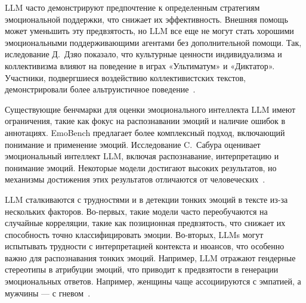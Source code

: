 LLM часто демонстрируют предпочтение к определенным стратегиям эмоциональной поддержки, что снижает их эффективность. Внешняя помощь может уменьшить эту предвзятость, но LLM все еще не могут стать хорошими эмоциональными поддерживающими агентами без дополнительной помощи. Так, иследование Д.~Дзяо показало, что культурные ценности индивидуализма и коллективизма влияют на поведение в играх «Ультиматум» и «Диктатор». Участники, подвергшиеся воздействию коллективистских текстов, демонстрировали более альтруистичное поведение~\cite{Jiao2023}.


Существующие бенчмарки для оценки эмоционального интеллекта LLM имеют ограничения, такие как фокус на распознавании эмоций и наличие ошибок в аннотациях. EmoBench предлагает более комплексный подход, включающий понимание и применение эмоций. Исследование C.~Сабура оценивает эмоциональный интеллект LLM, включая распознавание, интерпретацию и понимание эмоций. Некоторые модели достигают высоких результатов, но механизмы достижения этих результатов отличаются от человеческих~\cite{sabour2024}.

LLM сталкиваются с трудностями и в детекции тонких эмоций в тексте из-за нескольких факторов. Во-первых, такие модели часто переобучаются на случайные корреляции, такие как позиционная предвзятость, что снижает их способность точно классифицировать эмоции. Во-вторых, LLMs могут испытывать трудности с интерпретацией контекста и нюансов, что особенно важно для распознавания тонких эмоций. Например, LLM отражают гендерные стереотипы в атрибуции эмоций, что приводит к предвзятости в генерации эмоциональных ответов. Например, женщины чаще ассоциируются с эмпатией, а мужчины — с гневом~\cite{https://doi.org/10.48550/arxiv.2403.03121}.


\FloatBarrier
